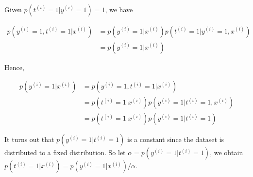 \begin{answer}
	\\
	Given $p(t^{(i)} = 1 | y^{(i)} = 1) = 1$, we have
	
	$$
	\begin{aligned}
		p(y^{(i)} = 1, t^{(i)} = 1 | x^{(i)}) & = p(y^{(i)} = 1| x^{(i)}) p(t^{(i)} = 1 | y^{(i)} = 1, x^{(i)})\\
		& = p(y^{(i)} = 1| x^{(i)})
	\end{aligned}
	$$
	
	Hence,
	
	$$
	\begin{aligned}
		p(y^{(i)} = 1| x^{(i)}) & = p(y^{(i)} = 1, t^{(i)} = 1 | x^{(i)})\\
		& = p(t^{(i)} = 1 | x^{(i)}) p(y^{(i)} = 1 | t^{(i)} = 1, x^{(i)})\\
		& = p(t^{(i)} = 1 | x^{(i)}) p(y^{(i)} = 1 | t^{(i)} = 1)
	\end{aligned}
	$$
	
	It turns out that $p(y^{(i)} = 1 | t^{(i)} = 1)$ is a constant since the dataset is distributed to a fixed distribution. So let $\alpha = p(y^{(i)} = 1 | t^{(i)} = 1)$, we obtain $p(t^{(i)} = 1 | x^{(i)}) = p(y^{(i)} = 1 | x^{(i)}) / \alpha$.
\end{answer}
